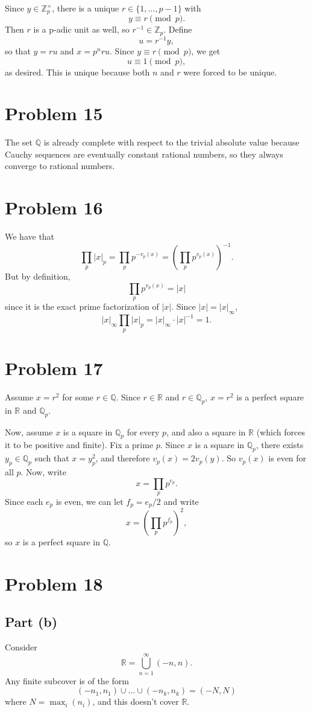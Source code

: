 \documentclass{article}
\newcommand{\Z}{\mathbb{Z}}
\newcommand{\Q}{\mathbb{Q}}
\newcommand{\R}{\mathbb{R}}
\newcommand{\bigp}[1]{\left(#1\right)}
\begin{document}
Since $y \in \Z_p^\times$, there is a unique $r \in \{1, \ldots, p - 1\}$ with
$$y \equiv r \pmod{p}.$$
Then $r$ is a p-adic unit as well, so $r^{-1} \in \Z_p$. Define
$$u = r^{-1}y,$$
so that $y = ru$ and $x = p^n ru$. Since $y \equiv r \pmod{p}$, we get
$$u \equiv 1 \pmod{p},$$
as desired. This is unique because both $n$ and $r$ were forced to be unique.

\section*{Problem 15}
The set $\Q$ is already complete with respect to the trivial absolute value because Cauchy sequences are eventually constant rational numbers, so they always converge to rational numbers.

\section*{Problem 16}
We have that
$$\prod_p |x|_p = \prod_p p^{-v_p(x)} = \bigp{\prod_p p^{v_p(x)}}^{-1}.$$
But by definition,
$$\prod_p p^{v_p(x)} = |x|$$
since it is the exact prime factorization of $|x|$. Since $|x| = |x|_\infty$,
$$|x|_\infty \prod_p |x|_p = |x|_\infty \cdot |x|^{-1} = 1.$$

\section*{Problem 17}
Assume $x = r^2$ for some $r \in \Q$. Since $r \in \R$ and $r \in \Q_p$, $x = r^2$ is a perfect square in $\R$ and $\Q_p$.

Now, assume $x$ is a square in $\Q_p$ for every $p$, and also a square in $\R$ (which forces it to be positive and finite).
Fix a prime $p$. Since $x$ is a square in $\Q_p$, there exists $y_p \in \Q_p$ such that $x = y_p^2$, and therefore $v_p(x) = 2v_p(y)$. So $v_p(x)$ is even for all $p$. Now, write
$$x = \prod_p p^{e_p}.$$
Since each $e_p$ is even, we can let $f_p = e_p/2$ and write
$$x = \bigp{\prod_p p^{f_p}}^2,$$
so $x$ is a perfect square in $\Q$.

\section*{Problem 18}
\subsection*{Part (b)}
Consider
$$\R = \bigcup_{n = 1}^\infty (-n, n).$$
Any finite subcover is of the form
$$(-n_1, n_1)\cup \ldots\cup(-n_k, n_k) = (-N, N)$$
where $N = \max_i(n_i)$, and this doesn't cover $\R$.
\end{document}
